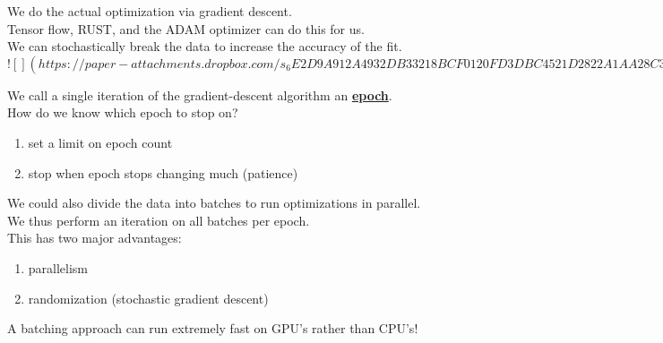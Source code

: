 \documentclass[../../lecture_notes.tex]{subfiles}
\begin{document}
\noindent We do the actual optimization via gradient descent.\\
Tensor flow, RUST, and the ADAM optimizer can do this for us.\\
We can stochastically break the data to increase the accuracy of the fit.\\

\newpage
$![](https://paper-attachments.dropbox.com/s_6E2D9A912A4932DB33218BCF0120FD3DBC4521D2822A1AA28C3A628B5392148D_1591134328128_Untitled+drawing+8.jpg)$
\newpage

\noindent We call a single iteration of the gradient-descent algorithm an \textbf{\underline{epoch}}.\\
How do we know which epoch to stop on?\\
	\begin{enumerate} [itemsep=0mm]
		\item set a limit on epoch count
		\item stop when epoch stops changing much (patience)
	\end{enumerate} \medskip

\noindent We could also divide the data into batches to run optimizations in parallel.\\
We thus perform an iteration on all batches per epoch.\\
This has two major advantages:
	\begin{enumerate} [itemsep=0mm]
		\item parallelism
		\item randomization (stochastic gradient descent)
	\end{enumerate}
\noindent A batching approach can run extremely fast on GPU’s rather than CPU’s!
\end{document}
